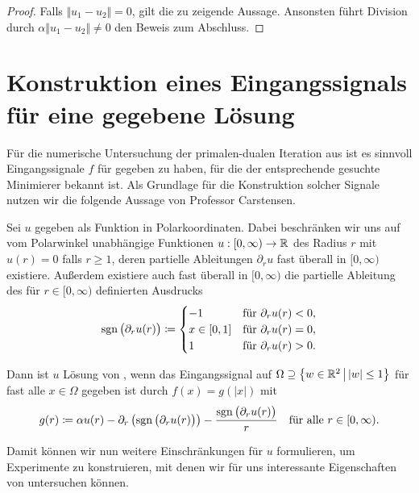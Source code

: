 \begin{proof}
  Falls $\Vert u_1 - u_2 \Vert = 0$, gilt die zu zeigende Aussage.
  Ansonsten führt Division durch $\alpha\Vert u_1 - u_2 \Vert\neq 0$ den
  Beweis zum Abschluss.
\end{proof}

\section{Konstruktion eines Eingangssignals für eine gegebene Lösung}
Für die numerische Untersuchung der primalen-dualen Iteration aus
 ist es sinnvoll
Eingangssignale $f$ für  gegeben zu haben, für die
der entsprechende gesuchte Minimierer bekannt ist. 
Als Grundlage für die Konstruktion solcher Signale nutzen wir die folgende 
Aussage von Professor Carstensen.

Sei $u$ gegeben als Funktion in Polarkoordinaten. 
Dabei beschränken wir uns auf vom Polarwinkel unabhängige Funktionen
$u:[0,\infty)\to\mathbb{R}$ des Radius $r$ mit $u(r)=0$ falls $r\geq 1$, deren
partielle Ableitungen $\partial_r u$ fast überall in $[0,\infty)$ existiere.
Außerdem existiere auch fast überall in $[0,\infty)$ die partielle Ableitung
des für $r\in[0,\infty)$ definierten Ausdrucks
\begin{align*}
  \operatorname{sgn}\big(\partial_r u(r)\big)
  \coloneqq
  \begin{cases}
    -1 &\text{für }\partial_r u(r)<0,\\
    x\in[0,1] &\text{für }\partial_r u(r)=0,\\ 
    1 &\text{für }\partial_r u(r)>0.
  \end{cases}
\end{align*}

Dann ist $u$ Lösung von , wenn das Eingangssignal
auf $\Omega\supseteq \left\{w\in\mathbb{R}^2\,\middle|\, |w|\leq
1\right\}$ für fast alle $x\in\Omega$ gegeben ist durch $f(x)=g(|x|)$ mit
\begin{align*}
  g(r)
  \coloneqq 
  \alpha u(r) - \partial_r\left(\operatorname{sgn}\big(\partial_r u(r)\big)\right) 
  - \frac{\operatorname{sgn}\big(\partial_r u(r)\big)}{r}
  \quad\text{für alle }r\in[0,\infty).
\end{align*}

Damit können wir nun weitere Einschränkungen für $u$ formulieren,
um Experimente zu konstruieren, mit denen wir für uns interessante
Eigenschaften von  untersuchen können.

